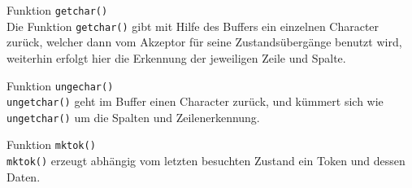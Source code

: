Funktion \texttt{getchar()} \\
Die Funktion \texttt{getchar()} gibt mit Hilfe des Buffers ein einzelnen Character zurück, welcher dann vom Akzeptor für seine Zustandsübergänge benutzt wird, weiterhin erfolgt hier die Erkennung der jeweiligen Zeile und Spalte.

Funktion \texttt{ungechar()}\\
\texttt{ungetchar()} geht im Buffer einen Character zurück, und kümmert sich wie \texttt{ungetchar()} um die Spalten und Zeilenerkennung.

Funktion \texttt{mktok()} \\
\texttt{mktok()} erzeugt abhängig vom letzten besuchten Zustand ein Token und dessen Daten.



